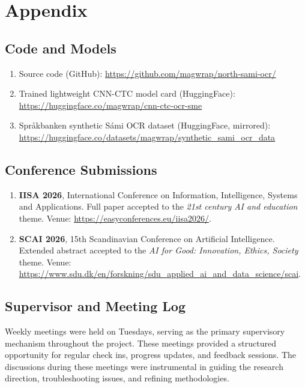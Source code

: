 \chapter{Appendix}
\label{appendix:deliverables}

\section{Code and Models}
\label{sec:appendix-code}

\begin{enumerate}
  \item Source code (GitHub): \url{https://github.com/magwrap/north-sami-ocr/}
  \item Trained lightweight CNN-CTC model card (HuggingFace): \url{https://huggingface.co/magwrap/cnn-ctc-ocr-sme}
  \item Spr\r{a}kbanken synthetic S\'{a}mi OCR dataset (HuggingFace, mirrored): \url{https://huggingface.co/datasets/magwrap/synthetic_sami_ocr_data}
\end{enumerate}


\section{Conference Submissions}
\label{sec:appendix-submissions}

\begin{enumerate}
  \item \textbf{IISA 2026}, International Conference on Information, Intelligence, Systems and Applications. Full paper accepted to the \textit{21st century AI and education} theme. Venue: \url{https://easyconferences.eu/iisa2026/}.
  \item \textbf{SCAI 2026}, 15th Scandinavian Conference on Artificial Intelligence. Extended abstract accepted to the \textit{AI for Good: Innovation, Ethics, Society} theme. Venue: \url{https://www.sdu.dk/en/forskning/sdu_applied_ai_and_data_science/scai}.
\end{enumerate}

\section{Supervisor and Meeting Log}
\label{sec:appendix-supervision}

Weekly meetings were held on Tuesdays, serving as the primary supervisory mechanism throughout the project. These meetings provided a structured opportunity for regular check ins, progress updates, and feedback sessions. The discussions during these meetings were instrumental in guiding the research direction, troubleshooting issues, and refining methodologies.

